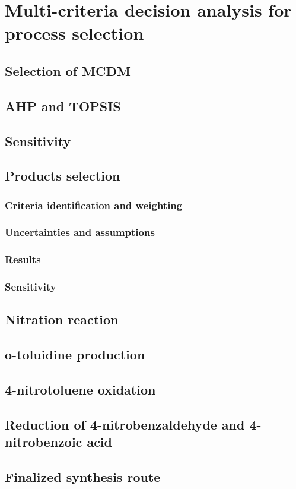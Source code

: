 \section{Multi-criteria decision analysis for process selection}

\subsection{Selection of MCDM}


\subsection{AHP and TOPSIS}


\subsection{Sensitivity}

\subsection{Products selection}

\subsubsection{Criteria identification and weighting}

\subsubsection{Uncertainties and assumptions}

\subsubsection{Results}

\subsubsection{Sensitivity}

\subsection{Nitration reaction}

\subsection{o-toluidine production}

\subsection{4-nitrotoluene oxidation}

\subsection{Reduction of 4-nitrobenzaldehyde and 4-nitrobenzoic acid}

\subsection{Finalized synthesis route} %
 
	 
	 
	
	
	
	
	
